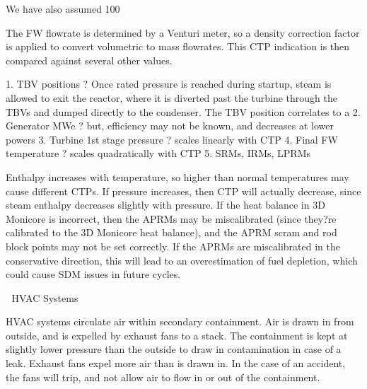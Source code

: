 \documentclass[10pt]{article}
\begin{document}
We have also assumed 100%



The FW flowrate is determined by a Venturi meter, so a density correction factor is applied to convert volumetric to mass flowrates. This CTP indication is then compared against several other values. 

1.	TBV positions ? Once rated pressure is reached during startup, steam is allowed to exit the reactor, where it is diverted past the turbine through the TBVs and dumped directly to the condenser. The TBV position correlates to a %
2.	Generator MWe ? but, efficiency may not be known, and decreases at lower powers
3.	Turbine 1st stage pressure ? scales linearly with CTP
4.	Final FW temperature ? scales quadratically with CTP
5.	SRMs, IRMs, LPRMs

Enthalpy increases with temperature, so higher than normal temperatures may cause different CTPs. If pressure increases, then CTP will actually decrease, since steam enthalpy decreases slightly with pressure. If the heat balance in 3D Monicore is incorrect, then the APRMs may be miscalibrated (since they?re calibrated to the 3D Monicore heat balance), and the APRM scram and rod block points may not be set correctly. If the APRMs are miscalibrated in the conservative direction, this will lead to an overestimation of fuel depletion, which could cause SDM issues in future cycles. 



HVAC Systems

HVAC systems circulate air within secondary containment. Air is drawn in from outside, and is expelled by exhaust fans to a stack. The containment is kept at slightly lower pressure than the outside to draw in contamination in case of a leak. Exhaust fans expel more air than is drawn in. In the case of an accident, the fans will trip, and not allow air to flow in or out of the containment. 
\end{document}
